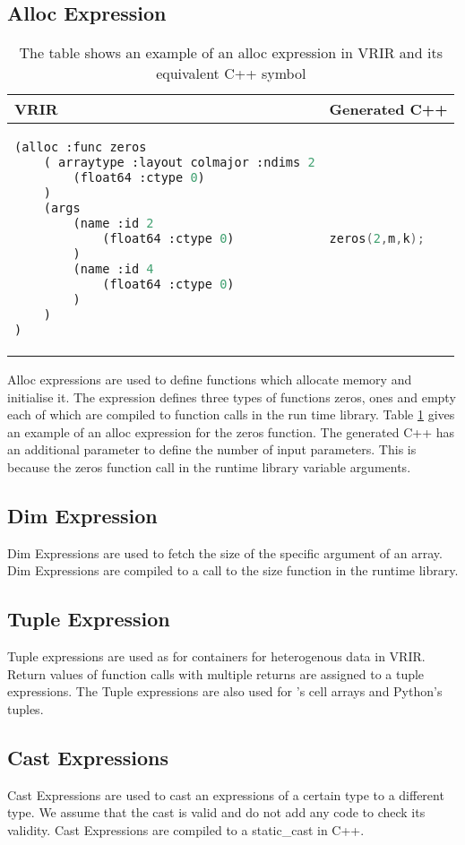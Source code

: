 \subsection{Alloc Expression}
\begin{table}[htbp]
\centering
\begin{tabular}{|l|l|}
\hline

VRIR &  Generated C++ \\
\hline
{
\begin{lstlisting}[language=lisp,frame=none, numbers=none]
(alloc :func zeros
	( arraytype :layout colmajor :ndims 2
		(float64 :ctype 0)
	)
	(args
   		(name :id 2
   			(float64 :ctype 0)
		)
		(name :id 4
   			(float64 :ctype 0)
		)
	)
)
\end{lstlisting}
}
&
{
\begin{lstlisting}[language=c,frame=none, numbers=none]
zeros(2,m,k);
\end{lstlisting}
} \\
\hline
\end{tabular}
\caption[Alloc Expression example]{The table shows an example of an alloc expression in VRIR and its equivalent C++ symbol}
\label{tab:allocExpr}
\end{table}
Alloc expressions are used to define functions which allocate memory and initialise it. The expression defines three types of functions zeros, ones and empty each of which are compiled to function calls in the run time library. Table \ref{tab:allocExpr} gives an example of an alloc expression for the zeros function. The generated C++ has an additional parameter to define the number of input parameters. This is because the zeros function call in the runtime library variable arguments.
\subsection{Dim Expression}
Dim Expressions are used to fetch the size of the specific argument of an array. Dim Expressions are compiled to a call to the size function in the runtime library.
\subsection{Tuple Expression}
Tuple expressions are used as for containers for heterogenous data in VRIR. Return values of function calls with multiple returns are assigned to a tuple expressions. The Tuple expressions are also used for \matlab's cell arrays and Python's tuples.
\subsection{Cast Expressions}
Cast Expressions are used to cast an expressions of a certain type to a different type. We assume that the cast is valid and do not add any code to check its validity. Cast Expressions are compiled to a static\_cast in C++.

